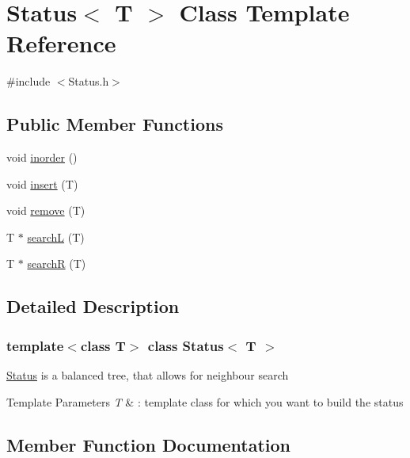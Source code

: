 \hypertarget{classStatus}{}\section{Status$<$ T $>$ Class Template Reference}
\label{classStatus}


{\ttfamily \#include $<$Status.\+h$>$}

\subsection*{Public Member Functions}
\begin{DoxyCompactItemize}
\item 
void \hyperlink{classStatus_aa019369b98450d3003f6359003fcb348}{inorder} ()
\item 
void \hyperlink{classStatus_a5fd5e49c03713d3b918010a15595d169}{insert} (T)
\item 
void \hyperlink{classStatus_afe333856c09425b4e0c7071ab4a700a5}{remove} (T)
\item 
T $\ast$ \hyperlink{classStatus_a0b6a56cd7787478d30814c372ce7aff3}{searchL} (T)
\item 
T $\ast$ \hyperlink{classStatus_a8db67cdc477f8f55b5c16678b2ec27f0}{searchR} (T)
\end{DoxyCompactItemize}


\subsection{Detailed Description}
\subsubsection*{template$<$class T$>$\newline
class Status$<$ T $>$}

\hyperlink{classStatus}{Status} is a balanced tree, that allows for neighbour search 
\begin{DoxyTemplParams}{Template Parameters}
{\em T} & \+: template class for which you want to build the status \\
\hline
\end{DoxyTemplParams}


\subsection{Member Function Documentation}
\mbox{\label{classStatus_aa019369b98450d3003f6359003fcb348}} 
